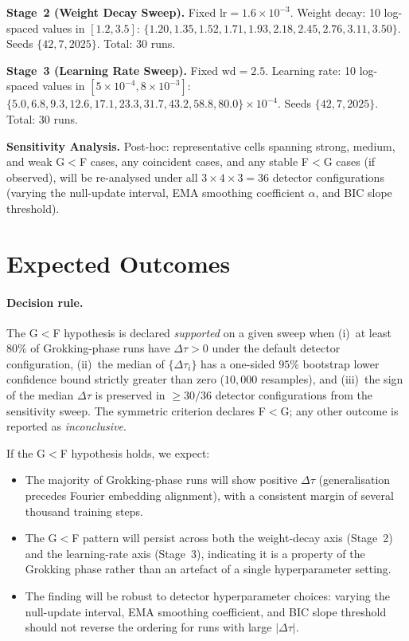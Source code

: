 \documentclass[12pt,openany,a4paper]{book}
\newcommand{\Dtau}{\Delta\tau}
\begin{document}
\textbf{Stage~2 (Weight Decay Sweep).}
Fixed $\mathrm{lr} = 1.6\times10^{-3}$.
Weight decay: 10 log-spaced values in $[1.2, 3.5]$:
$\{1.20, 1.35, 1.52, 1.71, 1.93, 2.18, 2.45, 2.76, 3.11, 3.50\}$.
Seeds $\{42, 7, 2025\}$. Total: 30 runs.

\textbf{Stage~3 (Learning Rate Sweep).}
Fixed $\mathrm{wd} = 2.5$.
Learning rate: 10 log-spaced values in $[5\times10^{-4}, 8\times10^{-3}]$:
$\{5.0, 6.8, 9.3, 12.6, 17.1, 23.3, 31.7, 43.2, 58.8, 80.0\}
\times 10^{-4}$.
Seeds $\{42, 7, 2025\}$. Total: 30 runs.

\textbf{Sensitivity Analysis.}
Post-hoc: representative cells spanning strong, medium, and weak
G$<$F cases, any coincident cases, and any stable F$<$G cases
(if observed), will be re-analysed under all $3\times4\times3 = 36$
detector configurations (varying the null-update interval, EMA
smoothing coefficient $\alpha$, and BIC slope threshold).

\section{Expected Outcomes}

\paragraph{Decision rule.}
The G$<$F hypothesis is declared \emph{supported} on a given sweep
when (i)~at least 80\% of Grokking-phase runs have $\Dtau > 0$
under the default detector configuration, (ii)~the median of
$\{\Dtau_i\}$ has a one-sided $95\%$ bootstrap lower confidence
bound \cite{efron1993bootstrap} strictly greater than zero
($10{,}000$ resamples), and (iii)~the sign of the median $\Dtau$
is preserved in $\geq 30/36$ detector configurations from the
sensitivity sweep.
The symmetric criterion declares F$<$G; any other outcome is
reported as \emph{inconclusive}.

If the G$<$F hypothesis holds, we expect:
\begin{itemize}
  \item The majority of Grokking-phase runs will show positive $\Dtau$
    (generalisation precedes Fourier embedding alignment), with a
    consistent margin of several thousand training steps.
  \item The G$<$F pattern will persist across both the weight-decay axis
    (Stage~2) and the learning-rate axis (Stage~3), indicating it is a
    property of the Grokking phase rather than an artefact of a single
    hyperparameter setting.
  \item The finding will be robust to detector hyperparameter choices:
    varying the null-update interval, EMA smoothing coefficient, and BIC
    slope threshold should not reverse the ordering for runs with large
    $|\Dtau|$.
\end{itemize}
\end{document}
